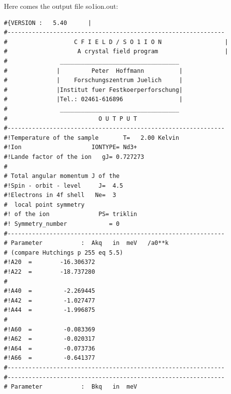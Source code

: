 \begin{enumerate}
Here comes the output file {\prg so1ion.out}:
{\footnotesize
\begin{verbatim}
#{VERSION :   5.40      |
#-------------------------------------------------------------- 
#                   C F I E L D / S O 1 I O N                  |
#                    A crystal field program                   |
#               __________________________________              
#              |         Peter  Hoffmann          |             
#              |    Forschungszentrum Juelich     |             
#              |Institut fuer Festkoerperforschung|             
#              |Tel.: 02461-616896                |             
#               __________________________________              
#                          O U T P U T                         
#-------------------------------------------------------------- 
#!Temperature of the sample       T=   2.00 Kelvin                
#!Ion                    IONTYPE= Nd3+                          
#!Lande factor of the ion   gJ= 0.727273                       
#                                                              
# Total angular momentum J of the                               
#!Spin - orbit - level     J=  4.5                            
#!Electrons in 4f shell   Ne=  3                              
#  local point symmetry                                        
#! of the ion              PS= triklin                               
#! Symmetry_number            = 0                              
#-------------------------------------------------------------- 
# Parameter           :  Akq   in  meV   /a0**k                  
# (compare Hutchings p 255 eq 5.5)                             
#!A20  =        -16.306372                                     
#!A22  =        -18.737280                                     
#                                                              
#!A40  =         -2.269445                                     
#!A42  =         -1.027477                                     
#!A44  =         -1.996875                                     
#                                                              
#!A60  =         -0.083369                                     
#!A62  =         -0.020317                                     
#!A64  =         -0.073736                                     
#!A66  =         -0.641377                                     
#-------------------------------------------------------------- 
#-------------------------------------------------------------- 
# Parameter           :  Bkq   in  meV                           

\end{verbatim}}
\end{enumerate}
